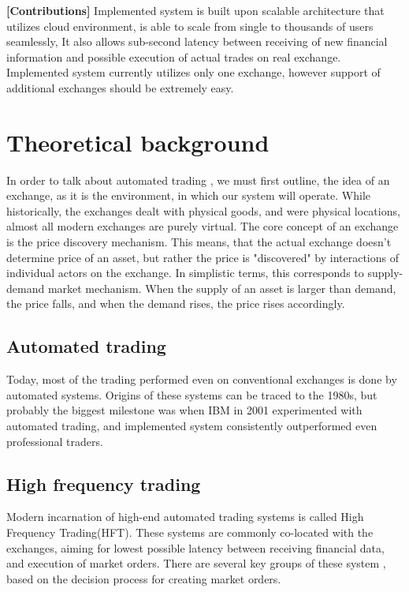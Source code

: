 \documentclass{ExcelAtFIT}
\begin{document}
    \textbf{[Contributions]} Implemented system is built upon scalable architecture that utilizes cloud environment, is able to scale from single to thousands of users seamlessly,
    It also allows sub-second latency between receiving of new financial information and possible execution of actual trades on real exchange.
    Implemented system currently utilizes only one exchange, however support of additional exchanges should be extremely easy.

    \section{Theoretical background}
    In order to talk about automated trading , we must first outline, the idea of an exchange, as it is the environment, in which our system will operate.
    While historically, the exchanges dealt with physical goods, and were physical locations, almost all modern exchanges are purely virtual. The core concept of
    an exchange is the price discovery mechanism. This means, that the actual exchange doesn't determine price of an asset, but rather the price is "discovered"
    by interactions of individual actors on the exchange. In simplistic terms, this corresponds to supply-demand market mechanism. When the supply of an asset is larger
    than demand, the price falls, and when the demand rises, the price rises accordingly.

    \subsection{Automated trading}
    Today, most of the trading performed even on conventional exchanges is done by automated systems. Origins of these systems can be traced to the 1980s, but probably the
    biggest milestone was when IBM in 2001\cite{Tesauro:2001:HBA:501158.501183} experimented with automated trading, and implemented system consistently outperformed even professional traders.

    \subsection{High frequency trading}
    Modern incarnation of high-end automated trading systems is called High Frequency Trading(HFT). These systems are commonly co-located with the exchanges, aiming for lowest possible latency
    between receiving financial data, and execution of market orders. There are several key groups of these system , based on the decision process for creating market orders.
\end{document}
